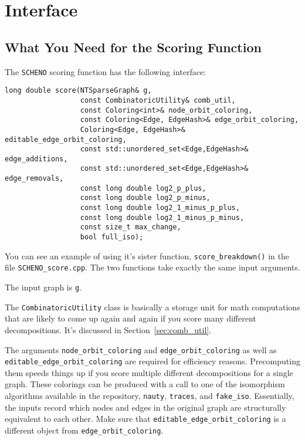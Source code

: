\documentclass{article}
\begin{document}
\newpage

\section{Interface}\label{sec:interface}

\subsection{What You Need for the Scoring Function}

The \verb|SCHENO| scoring function has the following interface:

\begin{verbatim}
long double score(NTSparseGraph& g,
                  const CombinatoricUtility& comb_util,
                  const Coloring<int>& node_orbit_coloring,
                  const Coloring<Edge, EdgeHash>& edge_orbit_coloring,
                  Coloring<Edge, EdgeHash>& editable_edge_orbit_coloring,
                  const std::unordered_set<Edge,EdgeHash>& edge_additions,
                  const std::unordered_set<Edge,EdgeHash>& edge_removals,
                  const long double log2_p_plus,
                  const long double log2_p_minus,
                  const long double log2_1_minus_p_plus,
                  const long double log2_1_minus_p_minus,
                  const size_t max_change,
                  bool full_iso);
\end{verbatim}

You can see an example of using it's sister function, \verb|score_breakdown()| in the file \verb|SCHENO_score.cpp|. The two functions take exactly the same input arguments.

The input graph is \verb|g|.

The \verb|CombinatoricUtility| class is basically a storage unit for math computations that are likely to come up again and again if you score many different decompositions. It's discussed in Section~\ref{sec:comb_util}.

The arguments \verb|node_orbit_coloring| and \verb|edge_orbit_coloring| as well as \verb|editable_edge_orbit_coloring| are required for efficiency reasons. Precomputing them speeds things up if you score multiple different decompositions for a single graph. These colorings can be produced with a call to one of the isomorphism algorithms available in the repository, \verb|nauty|, \verb|traces|, and \verb|fake_iso|. Essentially, the inputs record which nodes and edges in the original graph are structurally equivalent to each other. Make sure that \verb|editable_edge_orbit_coloring| is a different object from \verb|edge_orbit_coloring|.
\end{document}
